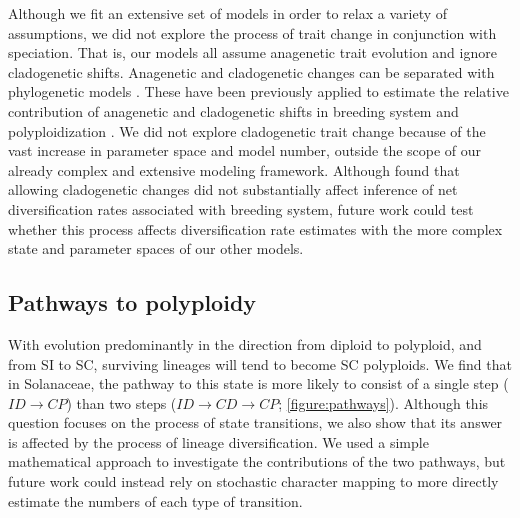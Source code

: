 Although we fit an extensive set of models in order to relax a variety of assumptions, we did not explore the process of trait change in conjunction with speciation.
That is, our models all assume anagenetic trait evolution and ignore cladogenetic shifts.
Anagenetic and cladogenetic changes can be separated with phylogenetic models \citep{mayrose_2011, goldberg_2012, magnuson-ford_2012}. 
These have been previously applied to estimate the relative contribution of anagenetic and cladogenetic shifts in breeding system \citep{goldberg_2012} and polyploidization \citep{zhan_2016, freyman_2017}.
We did not explore cladogenetic trait change because of the vast increase in parameter space and model number, outside the scope of our already complex and extensive modeling framework. %
Although \citet{goldberg_2012} found that allowing cladogenetic changes did not substantially affect inference of net diversification rates associated with breeding system, future work could test whether this process affects diversification rate estimates with the more complex state and parameter spaces of our other models.

\subsection{Pathways to polyploidy}

With evolution predominantly in the direction from diploid to polyploid, and from SI to SC, surviving lineages will tend to become SC polyploids.
We find that in Solanaceae, the pathway to this state is more likely to consist of a single step ($ID \rightarrow CP$) than two steps ($ID \rightarrow CD \rightarrow CP$; \cref{figure:pathways}).
Although this question focuses on the process of state transitions, we also show that its answer is affected by the process of lineage diversification.
We used a simple mathematical approach to investigate the contributions of the two pathways, but future work could instead rely on stochastic character mapping to more directly estimate the numbers of each type of transition.

